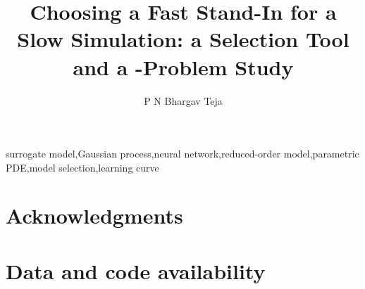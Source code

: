 \documentclass[preprint,11pt]{elsarticle}
\begin{document}
\begin{frontmatter}
\title{Choosing a Fast Stand-In for a Slow Simulation: a Selection Tool and a \NAllProblems-Problem Study}
\author[a]{P N Bhargav Teja}
\address[a]{Vellore Institute of Technology, India}
\begin{abstract}

\end{abstract}
\begin{keyword}surrogate model\sep Gaussian process\sep neural network\sep reduced-order model\sep parametric PDE\sep model selection\sep learning curve\end{keyword}
\end{frontmatter}









\section*{Acknowledgments}

\section*{Data and code availability}



\end{document}
